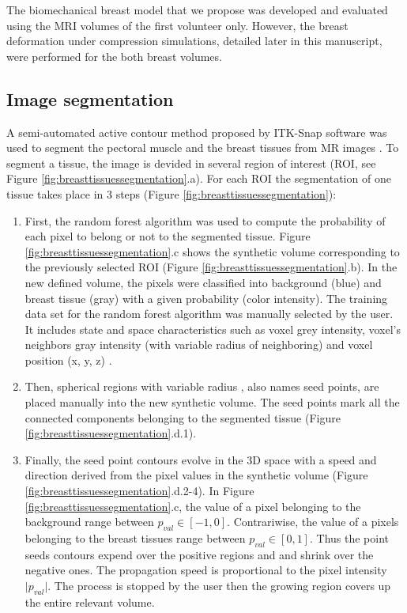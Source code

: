 The biomechanical breast model that we propose was developed and evaluated using the MRI volumes of the first volunteer only. However, the breast deformation under compression simulations, detailed later in this manuscript,  were performed for the both breast volumes. 
\subsection{Image segmentation}%

A semi-automated active contour method proposed by ITK-Snap software was used to segment the pectoral muscle and the breast tissues from MR images \citep{yushkevich_user_2006}. To segment a tissue, the image is devided in several region of interest (ROI, see Figure \ref{fig:breasttissuessegmentation}.a). For each ROI the segmentation of one tissue takes place in 3 steps (Figure \ref{fig:breasttissuessegmentation}):
\begin{enumerate}
\item First, the random forest algorithm \citep{ho_random_1995} was used to compute the probability of each pixel to belong or not to the segmented tissue. Figure \ref{fig:breasttissuessegmentation}.c shows the synthetic volume corresponding to the previously selected ROI (Figure \ref{fig:breasttissuessegmentation}.b). In the new defined volume, the pixels were classified into background (blue) and breast tissue (gray) with a given probability (color intensity). The training data set for the random forest algorithm was manually selected by the user. It includes state and space characteristics such as voxel grey intensity, voxel's neighbors gray intensity (with variable radius of neighboring) and voxel position (x, y, z) . 

\item Then, spherical regions with variable radius , also names seed points, are placed manually into the new synthetic volume. The seed points mark all the connected components belonging to the segmented tissue (Figure \ref{fig:breasttissuessegmentation}.d.1).

\item Finally, the seed point contours evolve in the 3D space with a speed and direction derived from the pixel values in the synthetic volume (Figure \ref{fig:breasttissuessegmentation}.d.2-4). In Figure \ref{fig:breasttissuessegmentation}.c, the value of a pixel belonging to the background range between $p_{val} \in [-1,0]$. Contrariwise, the value of a pixels belonging to the breast tissues range between $p_{val} \in [0,1]$. Thus the point seeds contours expend over the positive regions and and shrink over the negative ones. The propagation speed is proportional to the pixel intensity $\vert p_{val} \vert$. The process is stopped by the user then the growing region covers up the entire relevant volume.  
\end{enumerate}

